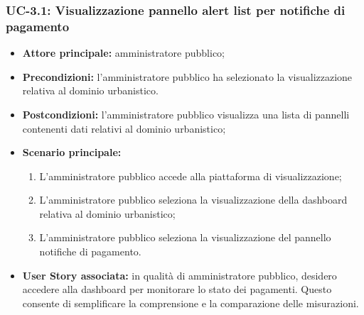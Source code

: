 \documentclass[8pt]{article}
\begin{document}
\subsubsection*{UC-3.1: Visualizzazione pannello alert list per notifiche di pagamento}
\begin{itemize}
    \item \textbf{Attore principale:} amministratore pubblico;
    \item \textbf{Precondizioni:} l’amministratore pubblico ha selezionato la visualizzazione
        relativa al dominio urbanistico.
    \item \textbf{Postcondizioni:} l'amministratore pubblico visualizza una lista di pannelli
        contenenti dati relativi al dominio urbanistico;
    \item \textbf{Scenario principale:} 
    \begin{enumerate}
    \item L’amministratore pubblico accede alla piattaforma di visualizzazione;
    \item L’amministratore pubblico seleziona la visualizzazione della dashboard relativa al dominio
        urbanistico;
    \item L’amministratore pubblico seleziona la visualizzazione del pannello notifiche di
        pagamento.
    \end{enumerate}
    \item \textbf{User Story associata:} in qualità di amministratore pubblico, desidero accedere
        alla dashboard per monitorare lo stato dei pagamenti. Questo consente di semplificare la
        comprensione e la comparazione delle misurazioni.
\end{itemize}
\end{document}
